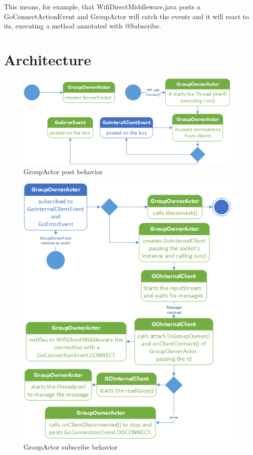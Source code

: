 This means, for example, that \textsf{WifiDirectMiddleware.java} posts a \textsf{GoConnectActionEvent} and \textsf{GroupActor} will catch the events and it will react to its, executing a method annotated with \textsf{@Subscribe}.

\section{Architecture}

\begin{figure}[thpb]
	\centering
	\includegraphics[scale=0.5]{./images/chap2/uml-parte0-2.png}
	\caption{GroupActor post behavior}
	\label{uml-part0-2}
\end{figure}	

\begin{figure}[thpb]
	\centering
	\includegraphics[scale=0.6]{./images/chap2/uml-parte0-3.png}
	\caption{GroupActor subscribe behavior}
	\label{uml-part0-3}
\end{figure}	

